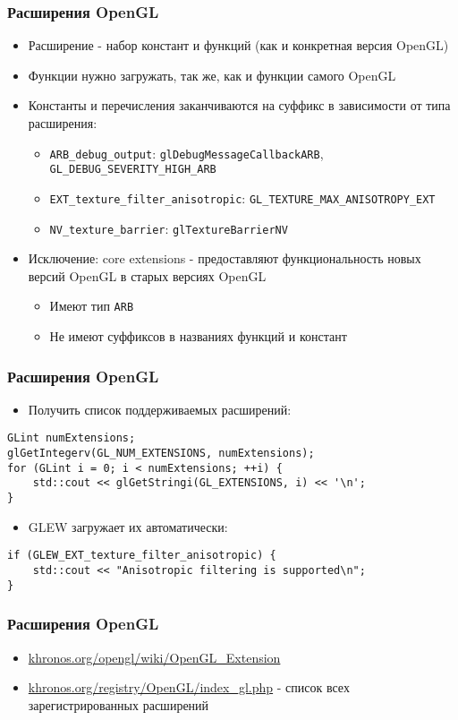 \documentclass{beamer}
\begin{document}
\begin{frame}[fragile]
\frametitle{Расширения OpenGL}
\begin{itemize}
\item Расширение - набор констант и функций (как и конкретная версия OpenGL)
\pause
\item Функции нужно загружать, так же, как и функции самого OpenGL
\pause
\item Константы и перечисления заканчиваются на суффикс в зависимости от типа расширения:
\begin{itemize}
\item \verb|ARB_debug_output|: \verb|glDebugMessageCallbackARB|, \verb|GL_DEBUG_SEVERITY_HIGH_ARB|
\item \verb|EXT_texture_filter_anisotropic|: \verb|GL_TEXTURE_MAX_ANISOTROPY_EXT|
\item \verb|NV_texture_barrier|: \verb|glTextureBarrierNV|
\end{itemize}
\pause
\item Исключение: core extensions - предоставляют функциональность новых версий OpenGL в старых версиях OpenGL
\begin{itemize}
\item Имеют тип \verb|ARB|
\item Не имеют суффиксов в названиях функций и констант
\end{itemize}  
\end{itemize}
\end{frame}

\begin{frame}[fragile]
\frametitle{Расширения OpenGL}
\begin{itemize}
\item Получить список поддерживаемых расширений:
\end{itemize}
\begin{verbatim}
GLint numExtensions;
glGetIntegerv(GL_NUM_EXTENSIONS, numExtensions);
for (GLint i = 0; i < numExtensions; ++i) {
    std::cout << glGetStringi(GL_EXTENSIONS, i) << '\n';
}
\end{verbatim}
\pause
\begin{itemize}
\item GLEW загружает их автоматически:
\end{itemize}
\begin{verbatim}
if (GLEW_EXT_texture_filter_anisotropic) {
    std::cout << "Anisotropic filtering is supported\n";
}
\end{verbatim}
\end{frame}

\begin{frame}[fragile]
\frametitle{Расширения OpenGL}
\begin{itemize}
\item \href{https://www.khronos.org/opengl/wiki/OpenGL_Extension}{khronos.org/opengl/wiki/OpenGL\_Extension}
\item \href{https://www.khronos.org/registry/OpenGL/index_gl.php}{khronos.org/registry/OpenGL/index\_gl.php} - список всех зарегистрированных расширений
\end{itemize}
\end{frame}
\end{document}
